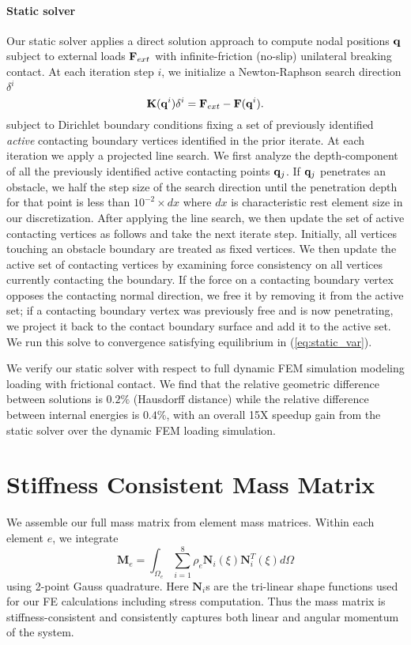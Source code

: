 \paragraph{Static solver} Our static solver applies a direct solution approach to compute nodal positions $\mathbf {q}$ subject to external loads $\mathbf {F}_{ext}$ with infinite-friction (no-slip) unilateral breaking contact. 
At each iteration step $i$, we initialize a Newton-Raphson search direction $\delta^i$ 
\[
\mathbf {K}(\mathbf {q}^{i})\delta^i = \mathbf {F}_{ext} - \mathbf {F}(\mathbf {q}^{i}).
\]
subject to Dirichlet boundary conditions fixing a set of previously identified \emph{active} contacting boundary vertices identified in the prior iterate. 
At each iteration we apply a projected line search. We first analyze the depth-component of all the previously identified active contacting points $\mathbf {q}_{j}$. If $\mathbf {q}_{j}$ penetrates an obstacle, we half the step size of the search direction until the penetration depth for that point is less than $10^{-2} \times dx$ where $dx$ is characteristic rest element size in our discretization. After applying the line search, we then update the set of active contacting vertices as follows and take the next iterate step.
Initially, all vertices touching an obstacle boundary are treated as fixed vertices.
We then update the active set of contacting vertices by examining force consistency on all vertices currently contacting the boundary. If the force on a contacting boundary vertex opposes the contacting normal direction, we free it by removing it from the active set; if a contacting boundary vertex was previously free and is now penetrating, we project it back to the contact boundary surface and add it to the active set. We run this solve to convergence satisfying equilibrium in (\ref{eq:static_var}).

We verify our static solver with respect to full dynamic FEM simulation modeling loading with frictional contact. We find that the relative geometric difference between solutions is $0.2\%$ (Hausdorff distance) while the relative difference between
internal energies is $0.4\%$, with an overall 15X speedup gain from the static solver over the dynamic FEM loading simulation.

\section{Stiffness Consistent Mass Matrix}

We assemble our full mass matrix from element mass matrices. Within each element $e$, we integrate
\[
\mathbf{M}_e = \int_{\Omega_e} \sum_{i=1}^8\rho_e \mathbf{N}_i(\xi)\mathbf{N}_i^T(\xi)d\Omega
\]
using 2-point Gauss quadrature.
Here $\mathbf{N}_i$s are the tri-linear shape functions used for our FE calculations including stress computation. Thus the mass matrix is stiffness-consistent and consistently captures both linear and angular momentum of the system.

